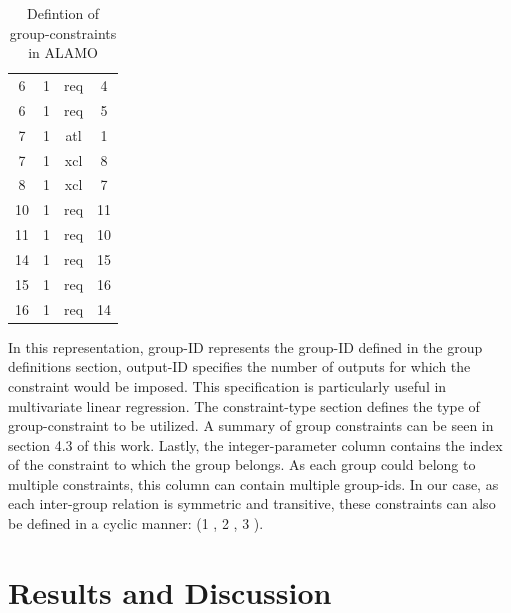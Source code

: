 \documentclass[a4paper,12pt]{article}
\begin{document}
\begin{table}[H]
\begin{tabular}{|c|c|c|c|}
6                 & 1                  & req                      & 4                          \\
6                 & 1                  & req                      & 5                          \\ \hline
7                 & 1                  & atl                      & 1                          \\
7                 & 1                  & xcl                      & 8                          \\
8                 & 1                  & xcl                      & 7                          \\ \hline
10                & 1                  & req                      & 11                         \\
11                & 1                  & req                      & 10                         \\ \hline
14                & 1                  & req                      & 15                         \\
15                & 1                  & req                      & 16                         \\
16                & 1                  & req                      & 14                         \\ \hline
\end{tabular}
\caption{Defintion of group-constraints in ALAMO}
\end{table}
\noindent In this representation, group-ID represents the group-ID defined in the group definitions section, output-ID specifies the number of outputs for which the constraint would be imposed. This specification is particularly useful in multivariate linear regression. The constraint-type section defines the type of group-constraint to be utilized. A summary of group constraints can be seen in section 4.3 of this work. Lastly, the integer-parameter column contains the index of the constraint to which the group belongs. As each group could belong to multiple constraints, this column can contain multiple group-ids. In our case, as each inter-group relation is symmetric and transitive, these constraints can also be defined in a cyclic manner: (1 , 2 , 3 ).
    
	\newpage
	\section{Results and Discussion}
\end{document}
